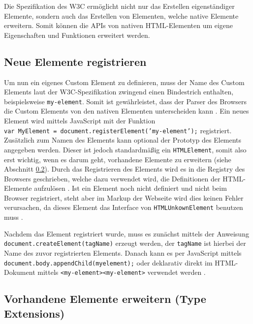 Die Spezifikation des \ac{W3C} ermöglicht nicht nur das Erstellen eigenständiger Elemente, sondern auch das Erstellen von Elementen, welche native Elemente erweitern. Somit können die \ac{API}s von nativen \ac{HTML}-Elementen um eigene Eigenschaften und Funktionen erweitert werden.


\subsection{Neue Elemente registrieren}\label{neue-elemente-registrieren}

Um nun ein eigenes Custom Element zu definieren, muss der Name des Custom Elements laut der \ac{W3C}-Spezifikation zwingend einen Bindestrich enthalten, beispielsweise \texttt{my-element}. Somit ist gewährleistet, dass der Parser des Browsers die Custom Elements von den nativen Elementen unterscheiden kann \cite{citeulike:13845061}. Ein neues Element wird mittels JavaScript mit der Funktion \texttt{var\ MyElement\ =\ document.registerElement('my-element');} registriert. Zusätzlich zum Namen des Elements kann optional der Prototyp des Elements angegeben werden. Dieser ist jedoch standardmäßig ein \texttt{HTMLElement}, somit also erst wichtig, wenn es darum geht, vorhandene Elemente zu erweitern (siehe Abschnitt \ref{vorhandene-elemente-erweitern-type-extensions}). Durch das Registrieren des Elements wird es in die Registry des Browsers geschrieben, welche dazu verwendet wird, die Definitionen der \ac{HTML}-Elemente aufzulösen \cite{citeulike:13844982}. Ist ein Element noch nicht definiert und nicht beim Browser registriert, steht aber im Markup der Webseite wird dies keinen Fehler verursachen, da dieses Element das Interface von \texttt{HTMLUnkownElement} benutzen muss \cite{citeulike:13851253}.

Nachdem das Element registriert wurde, muss es zunächst mittels der Anweisung \texttt{document.createElement(tagName)} erzeugt werden, der \texttt{tagName} ist hierbei der Name des zuvor registrierten Elements. Danach kann es per JavaScript mittels \texttt{document.body.appendChild(myelement);} oder deklarativ direkt im \ac{HTML}-Dokument mittels \texttt{\textless{}my-element\textgreater{}\textless{}my-element\textgreater{}} verwendet werden \cite[S. 127-138]{citeulike:13844975}.


\subsection{Vorhandene Elemente erweitern (Type Extensions)}\label{vorhandene-elemente-erweitern-type-extensions}

